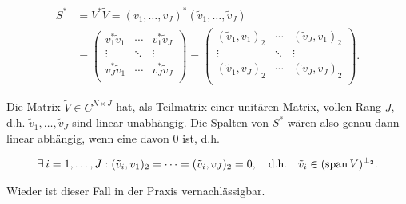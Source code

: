 \begin{enumerate}[label = \arabic*.]
    \begin{align*}
        S^\ast
        &=
        V^\ast \tilde V
        =
        (v_1, \dots, v_J)^\ast (\tilde v_1, \dots, \tilde v_J) \\
        &=
        \begin{pmatrix}
            v_1^\ast \tilde v_1 & \cdots & v_1^\ast \tilde v_J \\
            \vdots              & \ddots & \vdots              \\
            v_J^\ast \tilde v_1 & \cdots & v_J^\ast \tilde v_J \\
        \end{pmatrix}
        =
        \begin{pmatrix}
            (\tilde v_1, v_1)_2 & \cdots & (\tilde v_J, v_1)_2 \\
            \vdots              & \ddots & \vdots              \\
            (\tilde v_1, v_J)_2 & \cdots & (\tilde v_J, v_J)_2 \\
        \end{pmatrix}.
    \end{align*}

    Die Matrix $\tilde V \in C^{N \times J}$ hat, als Teilmatrix einer unitären Matrix, vollen Rang $J$, d.h. $\tilde v_1, \dots, \tilde v_J$ sind linear unabhängig.
    Die Spalten von $S^\ast$ wären also genau dann linear abhängig, wenn eine davon $0$ ist, d.h.

    \begin{align*}
        \exists \, i = 1, \dots, J:
            (\tilde v_i, v_1)_2 = \cdots = (\tilde v_i, v_J)_2 = 0,
            \quad
            \text{d.h.}
            \quad
            \tilde v_i \in (\operatorname{span} V)^{\bot_2}.
    \end{align*}

    Wieder ist dieser Fall in der Praxis vernachlässigbar.

\end{enumerate}
